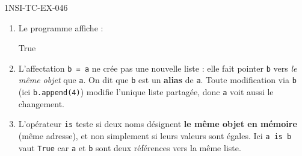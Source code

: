 \begin{corrige}{1NSI-TC-EX-046}
\begin{enumerate}
  \item Le programme affiche :
\begin{console}
[1, 2, 3, 4]
True
\end{console}

  \item L'affectation \lstinline{b = a} ne crée pas une nouvelle liste : elle fait pointer \lstinline{b} vers \emph{le même objet} que \lstinline{a}. On dit que \lstinline{b} est un \textbf{alias} de \lstinline{a}. Toute modification via \lstinline{b} (ici \lstinline{b.append(4)}) modifie l'unique liste partagée, donc \lstinline{a} voit aussi le changement.

  \item L'opérateur \lstinline{is} teste si deux noms désignent \textbf{le même objet en mémoire} (même adresse), et non simplement si leurs valeurs sont égales. Ici \lstinline{a is b} vaut \lstinline{True} car \lstinline{a} et \lstinline{b} sont deux références vers la même liste.
\end{enumerate}
\end{corrige}
